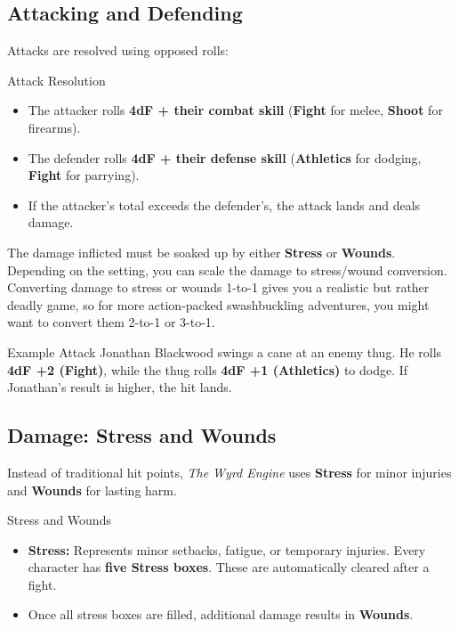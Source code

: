 \subsection{Attacking and Defending}
Attacks are resolved using opposed rolls:
\begin{DndReadAloud}{Attack Resolution}
\begin{itemize}
    \item The attacker rolls \textbf{4dF + their combat skill} (\textbf{Fight} for melee, \textbf{Shoot} for firearms).
    \item The defender rolls \textbf{4dF + their defense skill} (\textbf{Athletics} for dodging, \textbf{Fight} for parrying).
    \item If the attacker’s total exceeds the defender’s, the attack lands and deals damage.
\end{itemize}
\end{DndReadAloud}

The damage inflicted must be soaked up by either \textbf{Stress} or \textbf{Wounds}. Depending on the setting, you can scale the damage to stress/wound conversion. Converting damage to stress or wounds 1-to-1 gives you a realistic but rather deadly game, so for more action-packed swashbuckling adventures, you might want to convert them 2-to-1 or 3-to-1.

\begin{DndSidebar}[float=!t]{Example Attack}
Jonathan Blackwood swings a cane at an enemy thug. He rolls \textbf{4dF +2 (Fight)}, while the thug rolls \textbf{4dF +1 (Athletics)} to dodge. If Jonathan’s result is higher, the hit lands.
\end{DndSidebar}


\subsection{Damage: Stress and Wounds}
Instead of traditional hit points, \textit{The Wyrd Engine} uses \textbf{Stress} for minor injuries and \textbf{Wounds} for lasting harm.

\begin{DndReadAloud}{Stress and Wounds}
\begin{itemize}
    \item \textbf{Stress:} Represents minor setbacks, fatigue, or temporary injuries. Every character has \textbf{five Stress boxes}. These are automatically cleared after a fight.
    \item Once all stress boxes are filled, additional damage results in \textbf{Wounds}.
\end{itemize}
\end{DndReadAloud}

